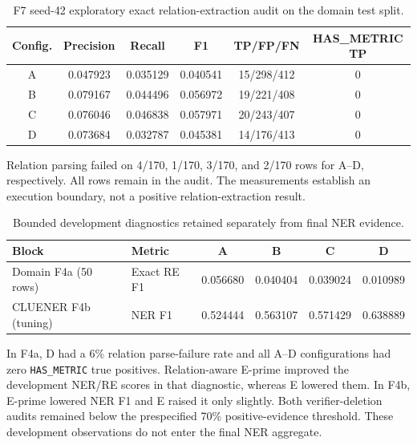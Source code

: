 \documentclass[10pt,a4paper]{article}
\begin{document}
\begin{table}[ht]
\caption{F7 seed-42 exploratory exact relation-extraction audit on the domain
test split.}
\label{tab:s-f7-re}
\centering
\begin{tabular}{cccccc}
\toprule
Config. & Precision & Recall & F1 & TP/FP/FN & HAS\_METRIC TP \\
\midrule
A & 0.047923 & 0.035129 & 0.040541 & 15/298/412 & 0 \\
B & 0.079167 & 0.044496 & 0.056972 & 19/221/408 & 0 \\
C & 0.076046 & 0.046838 & 0.057971 & 20/243/407 & 0 \\
D & 0.073684 & 0.032787 & 0.045381 & 14/176/413 & 0 \\
\bottomrule
\end{tabular}
\end{table}

Relation parsing failed on 4/170, 1/170, 3/170, and 2/170 rows for A--D,
respectively. All rows remain in the audit. The measurements establish an
execution boundary, not a positive relation-extraction result.

\begin{table}[ht]
\caption{Bounded development diagnostics retained separately from final NER
evidence.}
\label{tab:s-development}
\centering
\begin{tabular}{llcccc}
\toprule
Block & Metric & A & B & C & D \\
\midrule
Domain F4a (50 rows) & Exact RE F1 & 0.056680 & 0.040404 & 0.039024 & 0.010989 \\
CLUENER F4b (tuning) & NER F1 & 0.524444 & 0.563107 & 0.571429 & 0.638889 \\
\bottomrule
\end{tabular}
\end{table}

In F4a, D had a 6\% relation parse-failure rate and all A--D configurations
had zero \texttt{HAS\_METRIC} true positives. Relation-aware E-prime improved
the development NER/RE scores in that diagnostic, whereas E lowered them. In
F4b, E-prime lowered NER F1 and E raised it only slightly. Both
verifier-deletion audits remained below the prespecified 70\% positive-evidence
threshold. These development observations do not enter the final NER aggregate.
\end{document}
